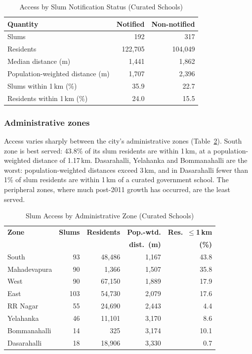 \documentclass[conference]{IEEEtran}
\newcommand{\km}{\,km}
\begin{document}
\begin{table}[!t]
\centering
\caption{Access by Slum Notification Status (Curated Schools)}
\label{tab:notif}
\footnotesize
\begin{tabular}{@{}lrr@{}}
\toprule
\textbf{Quantity} & \textbf{Notified} & \textbf{Non-notified} \\
\midrule
Slums & 192 & 317 \\
Residents & 122,705 & 104,049 \\
Median distance (m) & 1,441 & 1,862 \\
Population-weighted distance (m) & 1,707 & 2,396 \\
Slums within 1\km{} (\%) & 35.9 & 22.7 \\
Residents within 1\km{} (\%) & 24.0 & 15.5 \\
\bottomrule
\end{tabular}
\end{table}

\subsubsection{Administrative zones}
Access varies sharply between the city's administrative zones (Table~\ref{tab:zones}). South zone is best served: 43.8\% of its slum residents are within 1\km{}, at a population-weighted distance of 1.17\km{}. Dasarahalli, Yelahanka and Bommanahalli are the worst: population-weighted distances exceed 3\km{}, and in Dasarahalli fewer than 1\% of slum residents are within 1\km{} of a curated government school. The peripheral zones, where much post-2011 growth has occurred, are the least served.

\begin{table}[!t]
\centering
\caption{Slum Access by Administrative Zone (Curated Schools)}
\label{tab:zones}
\footnotesize
\begin{tabular}{@{}lrrrr@{}}
\toprule
\textbf{Zone} & \textbf{Slums} & \textbf{Residents} & \textbf{Pop.-wtd.} & \textbf{Res.\ $\le$1\km{}} \\
 & & & \textbf{dist.\ (m)} & \textbf{(\%)} \\
\midrule
South & 93 & 48,486 & 1,167 & 43.8 \\
Mahadevapura & 90 & 1,366 & 1,507 & 35.8 \\
West & 90 & 67,150 & 1,889 & 17.9 \\
East & 103 & 54,730 & 2,079 & 17.6 \\
RR Nagar & 55 & 24,690 & 2,443 & 4.4 \\
Yelahanka & 46 & 11,101 & 3,170 & 8.6 \\
Bommanahalli & 14 & 325 & 3,174 & 10.1 \\
Dasarahalli & 18 & 18,906 & 3,330 & 0.7 \\
\bottomrule
\end{tabular}
\end{table}
\end{document}
